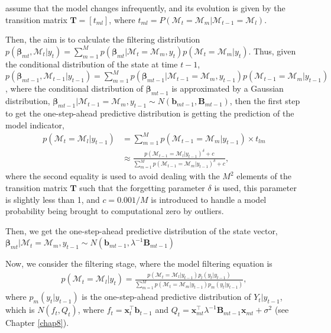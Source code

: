 \cite{raftery2010online} assume that the model changes infrequently, and its evolution is given by the transition matrix $\bm{T}=[t_{ml}]$, where $t_{ml}=P(\mathcal{M}_t=\mathcal{M}_m|\mathcal{M}_{t-1}=\mathcal{M}_l)$.

Then, the aim is to calculate the filtering distribution $p(\bm{\beta}_{mt},\mathcal{M}_t|y_t)=\sum_{m=1}^Mp(\bm{\beta}_{mt}|\mathcal{M}_t=\mathcal{M}_m,y_t)p(\mathcal{M}_t=\mathcal{M}_m|y_t)$. Thus, given the conditional distribution of the state at time $t-1$, $p(\bm{\beta}_{mt-1},\mathcal{M}_{t-1}|{y}_{t-1})=\sum_{m=1}^Mp(\bm{\beta}_{mt-1}|\mathcal{M}_{t-1}=\mathcal{M}_m,{y}_{t-1})p(\mathcal{M}_{t-1}=\mathcal{M}_m|{y}_{t-1})$, where the conditional distribution of $\bm{\beta}_{mt-1}$ is approximated by a Gaussian distribution, $\bm{\beta}_{mt-1}|\mathcal{M}_{t-1}=\mathcal{M}_{m},y_{t-1}\sim N(\bm{b}_{mt-1},\bm{B}_{mt-1})$, then the first step to get the one-step-ahead predictive distribution is getting the prediction of the model indicator, 
\begin{align*}
	p(\mathcal{M}_t=\mathcal{M}_l|y_{t-1})&=\sum_{m=1}^M p(\mathcal{M}_{t-1}=\mathcal{M}_m|y_{t-1})\times t_{lm}\\
	&\approx \frac{p(\mathcal{M}_{t-1}=\mathcal{M}_l|y_{t-1})^{\delta}+c}{\sum_{m=1}^M p(\mathcal{M}_{t-1}=\mathcal{M}_m|y_{t-1})^{\delta}+c},  
\end{align*}
where the second equality is used to avoid dealing with the $M^2$ elements of the transition matrix $\bm{T}$ such that the forgetting parameter $\delta$ is used, this parameter is slightly less than 1, and $c=0.001/M$ is introduced to handle a model probability being brought to computational zero by outliers.

Then, we get the one-step-ahead predictive distribution of the state vector, $\bm{\beta}_{mt}|\mathcal{M}_{t}=\mathcal{M}_{m},y_{t-1}\sim N(\bm{b}_{mt-1},\lambda^{-1}\bm{B}_{mt-1})$ 

Now, we consider the filtering stage, where the model filtering equation is 
\begin{align*}
	p(\mathcal{M}_t=\mathcal{M}_l|y_{t})=\frac{p(\mathcal{M}_t=\mathcal{M}_l|y_{t-1})p_l(y_t|y_{t-1})}{\sum_{m=1}^M p(\mathcal{M}_t=\mathcal{M}_m|y_{t-1})p_m(y_t|y_{t-1})},
\end{align*}
where $p_m(y_t|y_{t-1})$ is the one-step-ahead predictive distribution of $Y_t|{y}_{t-1}$, which is $N(f_t,Q_t)$, where $f_t=\bm{x}_t^{\top}\bm{b}_{t-1}$ and $Q_t=\bm{x}_{mt}^{\top}\lambda^{-1}\bm{B}_{mt-1}\bm{x}_{mt}+\sigma^2$ (see Chapter \ref{chap8}).

